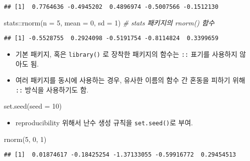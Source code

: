 \documentclass[
  12,
]{article}
\newenvironment{Shaded}{\begin{snugshade}}{\end{snugshade}}
\newcommand{\AttributeTok}[1]{\textcolor[rgb]{0.77,0.63,0.00}{#1}}
\newcommand{\CommentTok}[1]{\textcolor[rgb]{0.56,0.35,0.01}{\textit{#1}}}
\newcommand{\DecValTok}[1]{\textcolor[rgb]{0.00,0.00,0.81}{#1}}
\newcommand{\FunctionTok}[1]{\textcolor[rgb]{0.00,0.00,0.00}{#1}}
\newcommand{\NormalTok}[1]{#1}
\newcommand{\SpecialCharTok}[1]{\textcolor[rgb]{0.00,0.00,0.00}{#1}}
\providecommand{\tightlist}{%
  \setlength{\itemsep}{0pt}\setlength{\parskip}{0pt}}
\begin{document}
\begin{verbatim}
## [1]  0.7764636 -0.4945202  0.4896974 -0.5007566 -0.1512130
\end{verbatim}

\begin{Shaded}
\begin{Highlighting}[]
\NormalTok{stats}\SpecialCharTok{::}\FunctionTok{rnorm}\NormalTok{(}\AttributeTok{n =} \DecValTok{5}\NormalTok{, }\AttributeTok{mean =} \DecValTok{0}\NormalTok{, }\AttributeTok{sd =} \DecValTok{1}\NormalTok{) }\CommentTok{\# stats 패키지의 rnorm() 함수}
\end{Highlighting}
\end{Shaded}

\begin{verbatim}
## [1] -0.5528755  0.2924098 -0.5191754 -0.8114824  0.3399659
\end{verbatim}

\begin{itemize}
\item
  기본 패키지, 혹은 \texttt{library()} 로 장착한 패키지의 함수는
  \texttt{::} 표기를 사용하지 않아도 됨.
\item
  여러 패키지를 동시에 사용하는 경우, 유사한 이름의 함수 간 혼동을
  피하기 위해 \texttt{::} 방식을 사용하기도 함.
\end{itemize}

\begin{Shaded}
\begin{Highlighting}[]
\FunctionTok{set.seed}\NormalTok{(}\AttributeTok{seed =} \DecValTok{10}\NormalTok{)}
\end{Highlighting}
\end{Shaded}

\begin{itemize}
\tightlist
\item
  reproducibility 위해서 난수 생성 규칙을 \texttt{set.seed()}로 부여.
\end{itemize}

\begin{Shaded}
\begin{Highlighting}[]
\FunctionTok{rnorm}\NormalTok{(}\DecValTok{5}\NormalTok{, }\DecValTok{0}\NormalTok{, }\DecValTok{1}\NormalTok{)}
\end{Highlighting}
\end{Shaded}

\begin{verbatim}
## [1]  0.01874617 -0.18425254 -1.37133055 -0.59916772  0.29454513
\end{verbatim}
\end{document}
